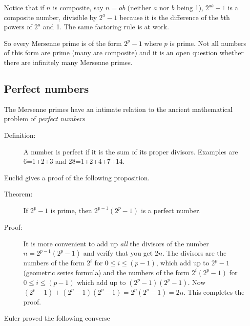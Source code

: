 \documentclass[12pt]{article}
\begin{document}
Notice that if $n$ is composite, say $n=ab$ (neither $a$ nor $b$ being 1), $2^{ab}-1$ is a composite number, divisible by $2^a-1$ because it is the difference of the $b$th powers of $2^a$ and 1.  The same factoring rule is at work.

So every Mersenne prime is of the form $2^p-1$ where $p$ is prime.  Not all numbers of this form are prime (many are composite) and it is an open question whether there are infinitely many Mersenne primes.


\subsection{Perfect numbers}

The Mersenne primes have an intimate relation to the ancient mathematical problem of {\em perfect numbers\/}

\begin{description}

\item[Definition:]  A number is perfect if it is the sum of its proper divisors.   Examples are 6=1+2+3 and 28=1+2+4+7+14.

\end{description}

Euclid gives a proof of the following proposition.

\begin{description}

\item[Theorem:]   If $2^p-1$ is prime, then $2^{p-1}(2^p-1)$ is a perfect number.

\item[Proof:]   It is more convenient to add up {\em all\/} the divisors of the number $n=2^{p-1}(2^p-1)$ and verify that you get $2n$.  The divisors are the numbers of the form $2^i$ for $0\leq i\leq (p-1)$, which add
up to $2^p-1$ (geometric series formula) and the numbers of the form $2^i(2^p-1)$ for  $0\leq i\leq (p-1)$ which add up to $(2^p-1)(2^p-1)$.  Now $(2^p-1) + (2^p-1)(2^p-1)=2^p(2^p-1)=2n$.   This completes the proof.

\end{description}

Euler proved the following converse
\end{document}
